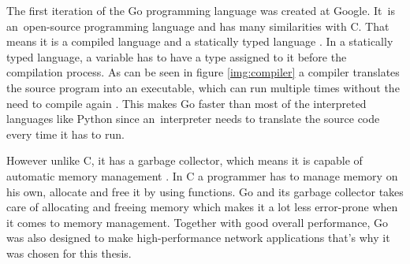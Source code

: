 The first iteration of the Go programming language was created at Google. It~is an~open-source programming language and has many similarities with C. That means it is a compiled language and a statically typed language \cite{Donovan2016}. In a statically typed language, a variable has to have a type assigned to it before the compilation process. As can be seen in figure \ref{img:compiler} a compiler translates the source program into an executable, which can run multiple times without the need to compile again \cite{Aho2006}. This makes Go faster than most of the interpreted languages like Python since an~interpreter needs to translate the source code every time it has to run.


However unlike C, it has a garbage collector, which means it is capable of automatic memory management \cite{Donovan2016}. In C a programmer has to manage memory on his own, allocate and free it by using functions. Go and its garbage collector takes care of allocating and freeing memory which makes it a lot less error-prone when it comes to memory management. Together with good overall performance, Go was also designed to make high-performance network applications that's why it was chosen for this thesis.
